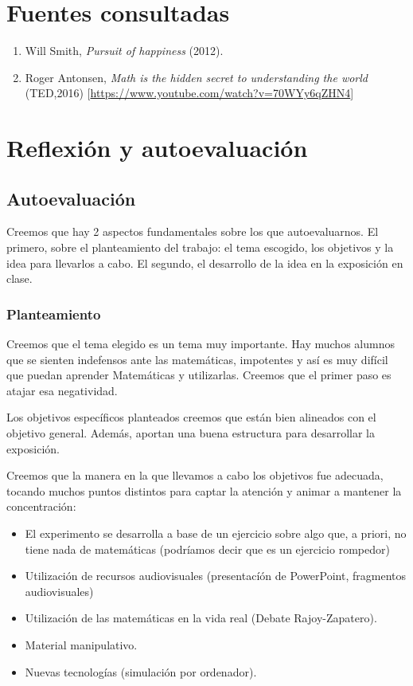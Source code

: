 \newpage
\section{Fuentes consultadas}

\begin{enumerate}
\item Will Smith, \textit{Pursuit of happiness} (2012).
\item Roger Antonsen, \textit{Math is the hidden secret to understanding the world } (TED,2016) [\url{https://www.youtube.com/watch?v=70WYy6qZHN4}]
\end{enumerate}

\section{Reflexión y autoevaluación}


\subsection{Autoevaluación}

Creemos que hay 2 aspectos fundamentales sobre los que autoevaluarnos. 
%
El primero, sobre el planteamiento del trabajo: el tema escogido, los objetivos y la idea para llevarlos a cabo.
%
El segundo, el desarrollo de la idea en la exposición en clase.

\subsubsection{Planteamiento}

Creemos que el tema elegido es un tema muy importante.
%
Hay muchos alumnos que se sienten indefensos ante las matemáticas, impotentes y así es muy difícil que puedan aprender Matemáticas y utilizarlas. Creemos que el primer paso es atajar esa negatividad.

Los objetivos específicos planteados creemos que están bien alineados con el objetivo general. 
%
Además, aportan una buena estructura para desarrollar la exposición.

Creemos que la manera en la que llevamos a cabo los objetivos fue adecuada, tocando muchos puntos distintos para captar la atención y animar a mantener la concentración: 
\begin{itemize}
	\item El experimento se desarrolla a base de un ejercicio sobre algo que, a priori, no tiene nada de matemáticas (podríamos decir que es un ejercicio rompedor)
	\item Utilización de recursos audiovisuales (presentacíón de PowerPoint, fragmentos audiovisuales)
	\item Utilización de las matemáticas en la vida real (Debate Rajoy-Zapatero).
	\item Material manipulativo.
	\item Nuevas tecnologías (simulación por ordenador).
\end{itemize}

